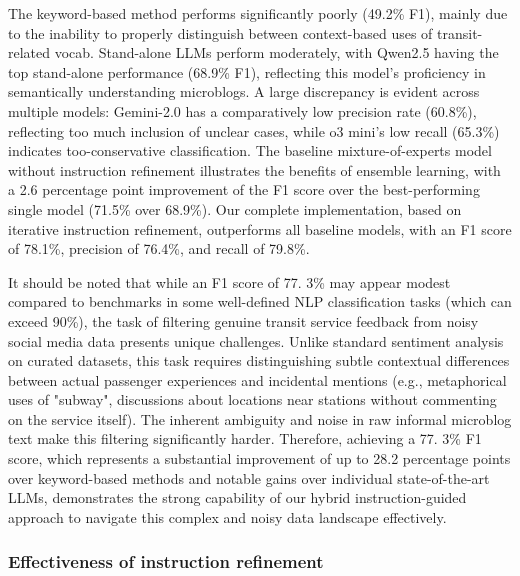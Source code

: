 \documentclass[a4paper,fleqn,12pt]{cas-sc}
\begin{document}
The keyword-based method performs significantly poorly (49.2\% F1), mainly due to the inability to properly distinguish between context-based uses of transit-related vocab. Stand-alone LLMs perform moderately, with Qwen2.5 having the top stand-alone performance (68.9\% F1), reflecting this model's proficiency in semantically understanding microblogs. A large discrepancy is evident across multiple models: Gemini-2.0 has a comparatively low precision rate (60.8\%), reflecting too much inclusion of unclear cases, while o3 mini's low recall (65.3\%) indicates too-conservative classification. The baseline mixture-of-experts model without instruction refinement illustrates the benefits of ensemble learning, with a 2.6 percentage point improvement of the F1 score over the best-performing single model (71.5\% over 68.9\%). Our complete implementation, based on iterative instruction refinement, outperforms all baseline models, with an F1 score of 78.1\%, precision of 76.4\%, and recall of 79.8\%.

It should be noted that while an F1 score of 77. 3\% may appear modest compared to benchmarks in some well-defined NLP classification tasks (which can exceed 90\%), the task of filtering genuine transit service feedback from noisy social media data presents unique challenges. Unlike standard sentiment analysis on curated datasets, this task requires distinguishing subtle contextual differences between actual passenger experiences and incidental mentions (e.g., metaphorical uses of "subway", discussions about locations near stations without commenting on the service itself). The inherent ambiguity and noise in raw informal microblog text make this filtering significantly harder. Therefore, achieving a 77. 3\% F1 score, which represents a substantial improvement of up to 28.2 percentage points over keyword-based methods and notable gains over individual state-of-the-art LLMs, demonstrates the strong capability of our hybrid instruction-guided approach to navigate this complex and noisy data landscape effectively.

\subsubsection{Effectiveness of instruction refinement}
\end{document}
